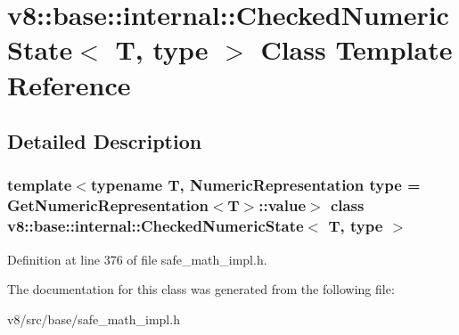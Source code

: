 \hypertarget{classv8_1_1base_1_1internal_1_1CheckedNumericState}{}\section{v8\+:\+:base\+:\+:internal\+:\+:Checked\+Numeric\+State$<$ T, type $>$ Class Template Reference}
\label{classv8_1_1base_1_1internal_1_1CheckedNumericState}


\subsection{Detailed Description}
\subsubsection*{template$<$typename T, Numeric\+Representation type = Get\+Numeric\+Representation$<$\+T$>$\+::value$>$\newline
class v8\+::base\+::internal\+::\+Checked\+Numeric\+State$<$ T, type $>$}



Definition at line 376 of file safe\+\_\+math\+\_\+impl.\+h.



The documentation for this class was generated from the following file\+:\begin{DoxyCompactItemize}
\item 
v8/src/base/safe\+\_\+math\+\_\+impl.\+h\end{DoxyCompactItemize}
